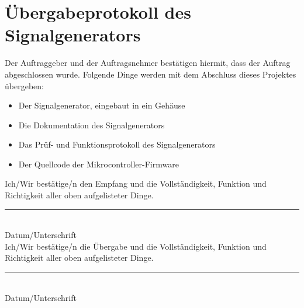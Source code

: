 \section[Übergabeprotokoll]{Übergabeprotokoll des Signalgenerators}
\bigskip
Der Auftraggeber und der Auftragsnehmer bestätigen hiermit, dass der Auftrag abgeschlossen wurde. Folgende Dinge werden mit dem Abschluss dieses Projektes übergeben:
\begin{itemize}
\item Der Signalgenerator, eingebaut in ein Gehäuse
\item Die Dokumentation des Signalgenerators
\item Das Prüf- und Funktionsprotokoll des Signalgenerators
\item Der Quellcode der Mikrocontroller-Firmware
\end{itemize}
\bigskip
\bigskip
\bigskip
Ich/Wir bestätige/n den Empfang und die Vollständigkeit, Funktion und Richtigkeit aller oben aufgelisteter Dinge.\\

\rule{5cm}{0.5mm}\\
Datum/Unterschrift\\

Ich/Wir bestätige/n die Übergabe und die Vollständigkeit, Funktion und Richtigkeit aller oben aufgelisteter Dinge.\\
\rule{5cm}{0.5mm}\\
Datum/Unterschrift